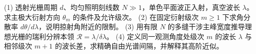 (1) 透射光栅周期 \(d\)、均匀照明刻线数 \(N\gg1\)，单色平面波正入射，真空波长 \(\lambda\)。求主极大衍射方向 \(\theta_m\) 的条件及允许级次。
(2) 在固定衍射级次 \(m\ge1\) 下求角分散率 \(d\theta/d\lambda\)，说明掠射角附近的限制。
(3) 用有限 \(N\) 的多缝干涉主峰宽度推导理想光栅的瑞利分辨本领 \(\mathcal R=\lambda/\delta\lambda\)。
(4) 定义同一观测角度处级次 \(m\) 的波长 \(\lambda\) 与相邻级次 \(m+1\) 的波长差，求精确自由光谱间隔，并解释其高阶近似。
